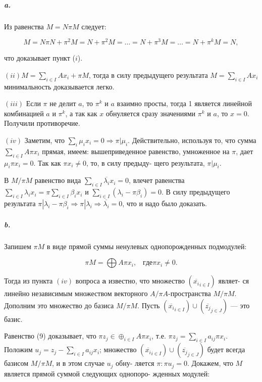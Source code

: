 {\subparagraph{a.} Из равенства $M = N \pi M$ следует:

\begin{equation*}
M = N \pi N + \pi^{2}M = N + \pi^{2}M =\dots= N + \pi^{3}M=\dots= N + \pi^{k}M = N,
\end{equation*}

\noindent что доказывает пункт ($i$).

$(ii) M = \sum_{i \in I}Ax_{i} + \pi M$, тогда в силу предыдущего результата
$M = \sum_{i \in I}Ax_{i}$ минимальность доказывается легко.

$(iii)$ Если $\pi$ не делит $a$, то $\pi^{k}$ и $a$ взаимно просты, тогда 1 является
линейной комбинацией $a$ и $\pi^{k}$, а так как $x$ обнуляется сразу значениями
$\pi^{k}$ и $a$, то $x = 0$. Получили противоречие.

$(iv)$ Заметим, что $\sum_{i}\mu_{i}x_{i} = 0 \Rightarrow \pi | \mu_{i}$. Действительно, используя
то, что сумма $\sum_{i \in I}A\pi x_{i}$ прямая, имеем: вышеприведенное равенство,
умноженное на $\pi$, дает $\mu_{i}\pi x_{i} = 0$. Так как $\pi x_{i} \neq 0$, то, в силу предыду-
щего результата, $\pi | \mu_{i}$.

В $M/\pi M$ равенство вида $\sum_{i \in I}\overline{\lambda_{i}}x_{i} = 0$, влечет равенства
$\sum_{i \in I}\lambda_{i}x_{i} = \pi\sum_{i \in I}\beta_{i}x_{i}$ и $\sum_{i \in I}(\lambda_{i} - \pi\beta_{i}) = 0$. В силу предыдущего
результата $\pi |\lambda_{i} - \pi\beta_{i} \Rightarrow \pi| \lambda_{i} \Rightarrow \overline{\lambda_{i}} = 0$, что и надо было доказать.

\subparagraph{b.} Запишем $\pi M$ в виде прямой суммы ненулевых однопорожденных
подмодулей:

\begin{equation}
\pi M = \bigoplus A\pi x_{i},\;\;\; где \pi x_{i} \neq 0.
\end{equation}

\noindent Тогда из пункта $(iv)$ вопроса {\bf a} известно, что множество $(\overline{x_{i}}_{i \in I})$ являет-
ся линейно независимым множеством векторного $A/\pi A$-пространства
$M/\pi M$. Дополним это множество до базиса $M/\pi M$. Пусть
$(\overline{x_{i}}_{i \in I}) \cup (\overline{z_{j}}_{j \in J})$ --- это базис.

Равенство (9) доказывает, что $\pi z_{j} \in \oplus_{i \in I}A\pi x_{i}$, т.е.
$\pi z_{j} = \sum_{i \in I}a_{ij}\pi x_{i}$. Положим $u_{j} = z_{j} - \sum_{i \in I}a_{ij}x_{i}$; множество
$(\overline{x_{i}}_{i \in I}) \cup (\overline{z_{j}}_{j \in J})$ будет всегда базисом $M/\pi M$, и в этом случае $u_{j}$ обну-
ляется $\pi: \pi u_{j} = 0$.
Докажем, что $M$ является прямой суммой следующих однопоро-
жденных модулей:

}
